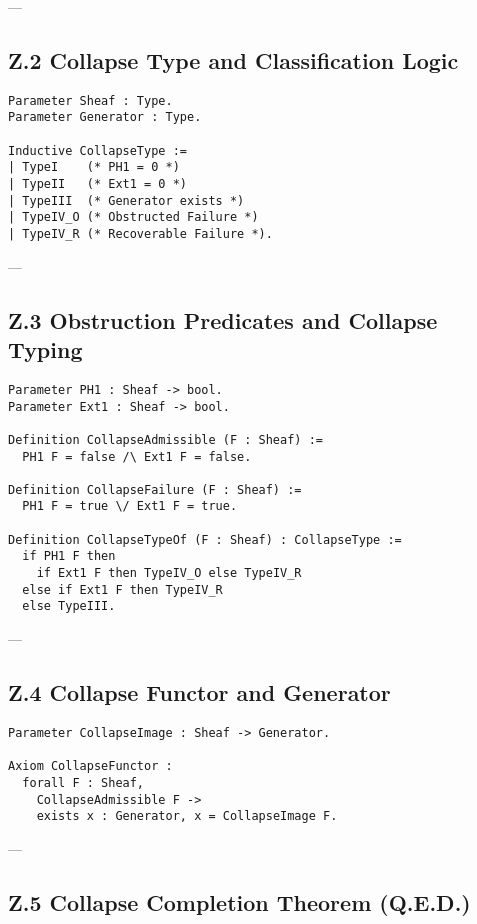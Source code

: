 \documentclass[11pt]{article}
\begin{document}
---

\subsection*{Z.2 Collapse Type and Classification Logic}

\begin{lstlisting}[language=Coq, caption={Collapse Typing System}]
Parameter Sheaf : Type.
Parameter Generator : Type.

Inductive CollapseType :=
| TypeI    (* PH1 = 0 *)
| TypeII   (* Ext1 = 0 *)
| TypeIII  (* Generator exists *)
| TypeIV_O (* Obstructed Failure *)
| TypeIV_R (* Recoverable Failure *).
\end{lstlisting}

---

\subsection*{Z.3 Obstruction Predicates and Collapse Typing}

\begin{lstlisting}[language=Coq, caption={Collapse Obstruction Predicates}]
Parameter PH1 : Sheaf -> bool.
Parameter Ext1 : Sheaf -> bool.

Definition CollapseAdmissible (F : Sheaf) :=
  PH1 F = false /\ Ext1 F = false.

Definition CollapseFailure (F : Sheaf) :=
  PH1 F = true \/ Ext1 F = true.

Definition CollapseTypeOf (F : Sheaf) : CollapseType :=
  if PH1 F then
    if Ext1 F then TypeIV_O else TypeIV_R
  else if Ext1 F then TypeIV_R
  else TypeIII.
\end{lstlisting}

---

\subsection*{Z.4 Collapse Functor and Generator}

\begin{lstlisting}[language=Coq, caption={Collapse Functor and Generator}]
Parameter CollapseImage : Sheaf -> Generator.

Axiom CollapseFunctor :
  forall F : Sheaf,
    CollapseAdmissible F ->
    exists x : Generator, x = CollapseImage F.
\end{lstlisting}

---

\subsection*{Z.5 Collapse Completion Theorem (Q.E.D.)}
\end{document}
